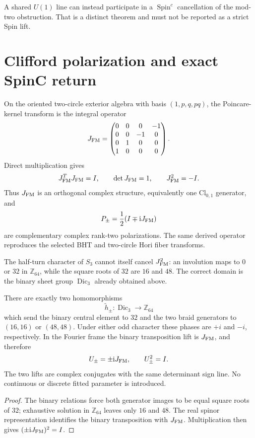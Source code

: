 \documentclass[11pt]{article}
\begin{document}
A shared $U(1)$ line can instead participate in a
$\operatorname{Spin}^c$ cancellation of the mod-two obstruction.  That is a
distinct theorem and must not be reported as a strict Spin lift.

\section{Clifford polarization and exact SpinC return}

On the oriented two-circle exterior algebra with basis $(1,p,q,pq)$, the
Poincare-kernel transform is the integral operator
\[
 J_{\rm FM}=
 \begin{pmatrix}
 0&0&0&-1\\
 0&0&-1&0\\
 0&1&0&0\\
 1&0&0&0
 \end{pmatrix}.
\]
Direct multiplication gives
\[
 J_{\rm FM}^{T}J_{\rm FM}=I,
 \qquad \det J_{\rm FM}=1,
 \qquad J_{\rm FM}^{2}=-I.
\]
Thus $J_{\rm FM}$ is an orthogonal complex structure, equivalently one
$\mathrm{Cl}_{0,1}$ generator, and
\[
 P_\pm=\frac12(I\mp\mathrm iJ_{\rm FM})
\]
are complementary complex rank-two polarizations. The same derived operator
reproduces the selected BHT and two-circle Hori fiber transforms.

The half-turn character of $S_3$ cannot itself cancel $J_{\rm FM}^{2}$:
an involution maps to $0$ or $32$ in $\mathbb Z_{64}$, while the square roots
of $32$ are $16$ and $48$. The correct domain is the binary sheet group
$\operatorname{Dic}_3$ already obtained above.

\begin{theorem}
There are exactly two homomorphisms
\[
 \widetilde h_\pm:\operatorname{Dic}_3\longrightarrow\mathbb Z_{64}
\]
which send the binary central element to $32$ and the two braid generators to
$(16,16)$ or $(48,48)$. Under either odd character these phases are $+i$ and
$-i$, respectively. In the Fourier frame the binary transposition lift is
$J_{\rm FM}$, and therefore
\[
 U_\pm=\pm\mathrm iJ_{\rm FM},
 \qquad U_\pm^2=I.
\]
The two lifts are complex conjugates with the same determinant sign line. No
continuous or discrete fitted parameter is introduced.
\end{theorem}

\begin{proof}
The binary relations force both generator images to be equal square roots of
$32$; exhaustive solution in $\mathbb Z_{64}$ leaves only $16$ and $48$.
The real spinor representation identifies the binary transposition with
$J_{\rm FM}$. Multiplication then gives
$(\pm\mathrm iJ_{\rm FM})^2=I$.
\end{proof}
\end{document}
